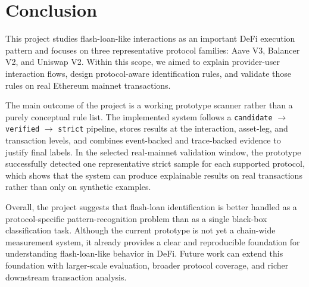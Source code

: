 \section{Conclusion}

This project studies flash-loan-like interactions as an important DeFi execution pattern and focuses on three representative protocol families: Aave V3, Balancer V2, and Uniswap V2. Within this scope, we aimed to explain provider-user interaction flows, design protocol-aware identification rules, and validate those rules on real Ethereum mainnet transactions.

The main outcome of the project is a working prototype scanner rather than a purely conceptual rule list. The implemented system follows a \texttt{candidate} $\rightarrow$ \texttt{verified} $\rightarrow$ \texttt{strict} pipeline, stores results at the interaction, asset-leg, and transaction levels, and combines event-backed and trace-backed evidence to justify final labels. In the selected real-mainnet validation window, the prototype successfully detected one representative strict sample for each supported protocol, which shows that the system can produce explainable results on real transactions rather than only on synthetic examples.

Overall, the project suggests that flash-loan identification is better handled as a protocol-specific pattern-recognition problem than as a single black-box classification task. Although the current prototype is not yet a chain-wide measurement system, it already provides a clear and reproducible foundation for understanding flash-loan-like behavior in DeFi. Future work can extend this foundation with larger-scale evaluation, broader protocol coverage, and richer downstream transaction analysis.
